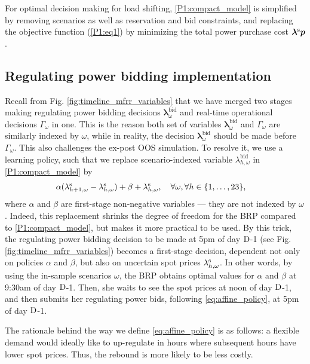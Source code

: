 For optimal decision making for load shifting, \eqref{P1:compact_model} is simplified by removing scenarios as well as reservation and bid constraints, and replacing the objective function (\ref{P1:eq1}) by minimizing the total power purchase cost $\bm{\lambda}^{\rm{s}} \bm{p}$.

\vspace{-1mm}
\subsection{Regulating power bidding implementation}\label{sec:mFRR_bidding_implementation}
Recall from  Fig. \ref{fig:timeline_mfrr_variables} that we have merged two stages making regulating power bidding decisions $\bm{\lambda}_{\omega}^{\text{bid}}$ and real-time operational decisions $\Gamma_{\omega}$ in one. This is the reason both set of variables $\bm{\lambda}_{\omega}^{\text{bid}}$ and $\Gamma_{\omega}$ are similarly indexed by $\omega$, while in reality, the decision $\bm{\lambda}_{\omega}^{\text{bid}}$ should be made before $\Gamma_{\omega}$. This also challenges the ex-post OOS simulation. To resolve it, we use a learning policy, such that we replace scenario-indexed variable $\lambda_{h,\omega}^{\text{bid}}$ in \eqref{P1:compact_model} by
%
\begin{align}\label{eq:affine_policy}
     & \alpha ( \lambda_{h+1,\omega}^{\rm{s}} - \lambda_{h,\omega}^{\rm{s}}) + \beta + \lambda_{h,\omega}^{\rm{s}}, \quad \forall{\omega}, \forall{h} \in \{1, \ldots, 23\},
\end{align}
where $\alpha$ and $\beta$ are first-stage non-negative variables --- they are not indexed by $\omega$. Indeed, this replacement shrinks the degree of freedom for the BRP compared to \eqref{P1:compact_model}, but makes it more practical to be used. By this trick, the regulating power bidding decision to be made at 5pm of day $\rm{D}$-1 (see Fig. \ref{fig:timeline_mfrr_variables}) becomes a first-stage decision, dependent not only on policies $\alpha$ and $\beta$, but also on uncertain spot prices $\lambda_{h,\omega}^{\rm{s}}$. In other words, by using the in-sample scenarios $\omega$, the BRP obtains optimal values for $\alpha$ and $\beta$ at 9:30am of day $\rm{D}$-1. Then, she waits to see the spot prices at noon of day $\rm{D}$-1, and then submits her regulating power bids, following \eqref{eq:affine_policy}, at 5pm of day $\rm{D}$-1.

The rationale behind the way we define \eqref{eq:affine_policy} is as follows: a flexible demand would ideally like to up-regulate in hours where subsequent hours have lower spot prices. Thus, the rebound is more likely to be less costly. 

